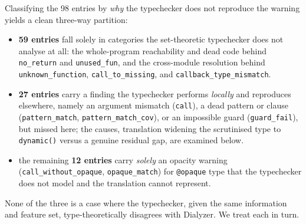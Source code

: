 \begin{table}[h]
\label{tab:dialyzer-cats}
\end{table}

Classifying the 98 entries by \emph{why} the typechecker does not reproduce the warning yields a clean three-way partition:
\begin{itemize}
  \item \textbf{59 entries} fall solely in categories the set-theoretic typechecker does not analyse at all: the whole-program reachability and dead code behind \texttt{no\_return} and \texttt{unused\_fun}, and the cross-module resolution behind \texttt{unknown\_function}, \texttt{call\_to\_missing}, and \texttt{callback\_type\_mismatch}.
  \item \textbf{27 entries} carry a finding the typechecker performs \emph{locally} and reproduces elsewhere, namely an argument mismatch (\texttt{call}), a dead pattern or clause (\texttt{pattern\_match}, \texttt{pattern\_match\_cov}), or an impossible guard (\texttt{guard\_fail}), but missed here; the causes, translation widening the scrutinised type to \texttt{dynamic()} versus a genuine residual gap, are examined below.
  \item the remaining \textbf{12 entries} carry \emph{solely} an opacity warning (\texttt{call\_without\_opaque}, \texttt{opaque\_match}) for \texttt{@opaque} type that the typechecker does not model and the translation cannot represent.
\end{itemize}
None of the three is a case where the typechecker, given the same information and feature set, type-theoretically disagrees with Dialyzer. We treat each in turn.

